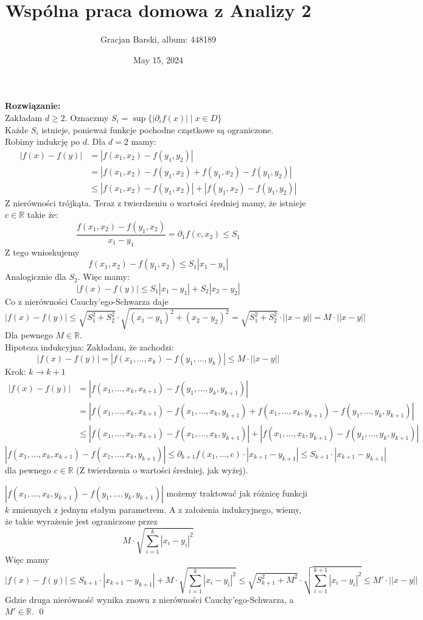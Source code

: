 \documentclass[11pt]{article}
\title{Wspólna praca domowa z Analizy 2}
\author{Gracjan Barski, album: 448189}
\date{May 15, 2024}
\newcommand{\R}{\mathbb{R}}
\begin{document}
\maketitle
\onehalfspacing
\textbf{Rozwiązanie:} \\[5pt]
Zakładam $d \geq 2$. Oznaczmy $S_i = \sup \{ | \partial_i f(x) | \mid x \in D\}$\\ Każde $S_i$ istnieje, ponieważ funkcje pochodne cząstkowe są ograniczone. \\[5pt]
Robimy indukcję po $d$. Dla $d = 2$ mamy:
\begin{align*}
|f(x) - f(y)| &= |f(x_1, x_2) - f(y_1, y_2)| \\ 
&= |f(x_1, x_2) - f(y_1, x_2) + f(y_1, x_2) - f(y_1, y_2)| \\
&\leq |f(x_1, x_2) - f(y_1, x_2)| + |f(y_1, x_2) - f(y_1, y_2)|  
\end{align*}
Z nierówności trójkąta. Teraz z twierdzeniu o wartości średniej mamy, że istnieje $c \in \R$ takie że:
$$\frac{f(x_1, x_2) - f(y_1, x_2)}{x_1 - y_1} = \partial_1 f(c, x_2) \leq S_1$$
Z tego wnioskujemy
$$f(x_1, x_2) - f(y_1, x_2) \leq S_1 |x_1 - y_1|$$
Analogicznie dla $S_2$. Więc mamy:
$$|f(x) - f(y)| \leq S_1 |x_1 - y_1| + S_2 |x_2 - y_2|$$
Co z nierówności Cauchy'ego-Schwarza daje 
$$|f(x) - f(y)| \leq \sqrt{S_1^2 + S_2^2} \cdot \sqrt{(x_1 - y_1)^2 + (x_2 - y_2)^2} = \sqrt{S_1^2 + S_2^2} \cdot ||x - y|| = M \cdot ||x - y||$$
Dla pewnego $M \in \R$. \\[5pt]
Hipoteza indukcyjna: Zakładam, że zachodzi:
$$|f(x) - f(y)| = |f(x_1, \ldots, x_k) - f(y_1, \ldots, y_k)| \leq M \cdot ||x - y||$$
Krok: $k \to k + 1$
\begin{align*}
|f(x) - f(y)| &= |f(x_1, \ldots, x_k, x_{k+1}) - f(y_1, \ldots, y_k, y_{k+1})| \\
&= |f(x_1, \ldots, x_k, x_{k+1}) - f(x_1, \ldots, x_k, y_{k+1}) + f(x_1, \ldots, x_k, y_{k+1}) - f(y_1, \ldots, y_k, y_{k+1})| \\
&\leq |f(x_1, \ldots, x_k, x_{k+1}) - f(x_1, \ldots, x_k, y_{k+1})| + |f(x_1, \ldots, x_k, y_{k+1}) - f(y_1, \ldots, y_k, y_{k+1})|
\end{align*}
$|f(x_1, \ldots, x_k, x_{k+1}) - f(x_1, \ldots, x_k, y_{k+1})| \leq \partial_{k+1}f(x_1, \ldots, c) \cdot |x_{k+1} - y_{k+1}| \leq S_{k+1} \cdot |x_{k+1} - y_{k+1}|$ dla pewnego $c \in \R$ (Z twierdzenia o wartości średniej, jak wyżej).
\newpage

$|f(x_1, \ldots, x_k, y_{k+1}) - f(y_1, \ldots, y_k, y_{k+1})|$ możemy traktować jak różnicę funkcji $k$ zmiennych z jednym stałym parametrem. A z założenia indukcyjnego, wiemy, że takie wyrażenie jest ograniczone przez 
$$M \cdot \sqrt{\sum_{i=1}^k |x_i - y_i|^2}$$
Więc mamy 
$$|f(x) - f(y)| \leq S_{k+1} \cdot |x_{k+1} - y_{k+1}| + M \cdot \sqrt{\sum_{i=1}^k |x_i - y_i|^2} \leq \sqrt{S_{k+1}^2 + M^2} \cdot \sqrt{\sum_{i=1}^{k+1} |x_i - y_i|^2} \leq M' \cdot ||x - y||$$
Gdzie druga nierówność wynika znowu z nierówności Cauchy'ego-Schwarza, a $M' \in \R$. \qed 
\end{document}
